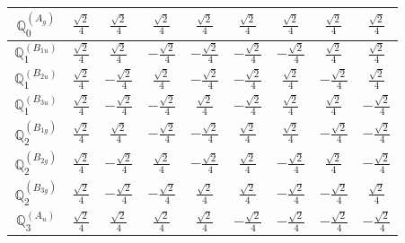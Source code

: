 \documentclass[fleqn,10pt,landscape]{article}
\begin{document}
\begin{itemize}
{\begin{center}
\begin{longtable}{ccccccccc}
$\mathbb{Q}_{0}^{(A_{g})}$ & $ \frac{\sqrt{2}}{4} $ & $ \frac{\sqrt{2}}{4} $ & $ \frac{\sqrt{2}}{4} $ & $ \frac{\sqrt{2}}{4} $ & $ \frac{\sqrt{2}}{4} $ & $ \frac{\sqrt{2}}{4} $ & $ \frac{\sqrt{2}}{4} $ & $ \frac{\sqrt{2}}{4} $ \\ \hline
$\mathbb{Q}_{1}^{(B_{1u})}$ & $ \frac{\sqrt{2}}{4} $ & $ \frac{\sqrt{2}}{4} $ & $ - \frac{\sqrt{2}}{4} $ & $ - \frac{\sqrt{2}}{4} $ & $ - \frac{\sqrt{2}}{4} $ & $ - \frac{\sqrt{2}}{4} $ & $ \frac{\sqrt{2}}{4} $ & $ \frac{\sqrt{2}}{4} $ \\ \hline
$\mathbb{Q}_{1}^{(B_{2u})}$ & $ \frac{\sqrt{2}}{4} $ & $ - \frac{\sqrt{2}}{4} $ & $ \frac{\sqrt{2}}{4} $ & $ - \frac{\sqrt{2}}{4} $ & $ - \frac{\sqrt{2}}{4} $ & $ \frac{\sqrt{2}}{4} $ & $ - \frac{\sqrt{2}}{4} $ & $ \frac{\sqrt{2}}{4} $ \\ \hline
$\mathbb{Q}_{1}^{(B_{3u})}$ & $ \frac{\sqrt{2}}{4} $ & $ - \frac{\sqrt{2}}{4} $ & $ - \frac{\sqrt{2}}{4} $ & $ \frac{\sqrt{2}}{4} $ & $ - \frac{\sqrt{2}}{4} $ & $ \frac{\sqrt{2}}{4} $ & $ \frac{\sqrt{2}}{4} $ & $ - \frac{\sqrt{2}}{4} $ \\ \hline
$\mathbb{Q}_{2}^{(B_{1g})}$ & $ \frac{\sqrt{2}}{4} $ & $ \frac{\sqrt{2}}{4} $ & $ - \frac{\sqrt{2}}{4} $ & $ - \frac{\sqrt{2}}{4} $ & $ \frac{\sqrt{2}}{4} $ & $ \frac{\sqrt{2}}{4} $ & $ - \frac{\sqrt{2}}{4} $ & $ - \frac{\sqrt{2}}{4} $ \\ \hline
$\mathbb{Q}_{2}^{(B_{2g})}$ & $ \frac{\sqrt{2}}{4} $ & $ - \frac{\sqrt{2}}{4} $ & $ \frac{\sqrt{2}}{4} $ & $ - \frac{\sqrt{2}}{4} $ & $ \frac{\sqrt{2}}{4} $ & $ - \frac{\sqrt{2}}{4} $ & $ \frac{\sqrt{2}}{4} $ & $ - \frac{\sqrt{2}}{4} $ \\ \hline
$\mathbb{Q}_{2}^{(B_{3g})}$ & $ \frac{\sqrt{2}}{4} $ & $ - \frac{\sqrt{2}}{4} $ & $ - \frac{\sqrt{2}}{4} $ & $ \frac{\sqrt{2}}{4} $ & $ \frac{\sqrt{2}}{4} $ & $ - \frac{\sqrt{2}}{4} $ & $ - \frac{\sqrt{2}}{4} $ & $ \frac{\sqrt{2}}{4} $ \\ \hline
$\mathbb{Q}_{3}^{(A_{u})}$ & $ \frac{\sqrt{2}}{4} $ & $ \frac{\sqrt{2}}{4} $ & $ \frac{\sqrt{2}}{4} $ & $ \frac{\sqrt{2}}{4} $ & $ - \frac{\sqrt{2}}{4} $ & $ - \frac{\sqrt{2}}{4} $ & $ - \frac{\sqrt{2}}{4} $ & $ - \frac{\sqrt{2}}{4} $ \\
\end{longtable}
\end{center}
}
\end{itemize}
\end{document}
